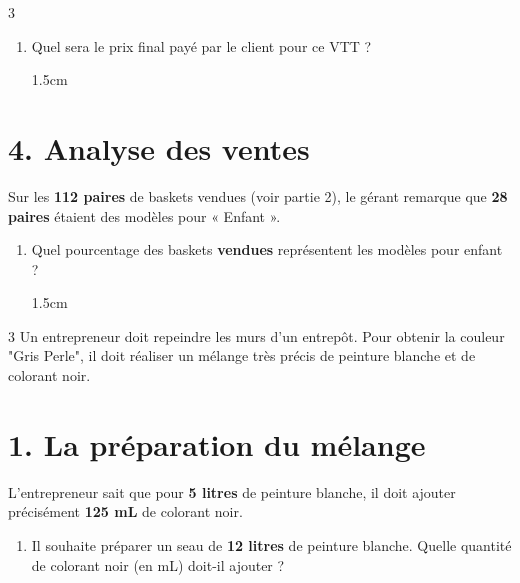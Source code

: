 \documentclass[a4paper]{book}
\begin{document}
{\begin{exerciceNote}{3}
\begin{enumerate}[resume, leftmargin=*]
\begin{enumerate}[label=\alph*), leftmargin=*]
\newpage
                
                \item Quel sera le prix final payé par le client pour ce VTT ?
                
                \begin{ZoneReponse}{1.5cm}                
                \end{ZoneReponse}
            \end{enumerate}
        \end{enumerate}
        
        \section*{4. Analyse des ventes}
        Sur les \textbf{112 paires} de baskets vendues (voir partie 2), le gérant remarque que \textbf{28 paires} étaient des modèles pour « Enfant ».
        
        \begin{enumerate}[resume, leftmargin=*]
            \item Quel pourcentage des baskets \textbf{vendues} représentent les modèles pour enfant ?
            
            \begin{ZoneReponse}{1.5cm}                
            \end{ZoneReponse}
        \end{enumerate}  
    \end{exerciceNote}


    \begin{exerciceNote}{3}
        Un entrepreneur doit repeindre les murs d'un entrepôt. Pour obtenir la couleur "Gris Perle", il doit réaliser un mélange très précis de peinture blanche et de colorant noir.

        \section*{1. La préparation du mélange}
        L'entrepreneur sait que pour \textbf{5 litres} de peinture blanche, il doit ajouter précisément \textbf{125 mL} de colorant noir.
        
        
        \begin{enumerate}[leftmargin=*]
            \item Il souhaite préparer un seau de \textbf{12 litres} de peinture blanche. Quelle quantité de colorant noir (en mL) doit-il ajouter ?


\end{enumerate}
\end{exerciceNote}}
\end{document}

